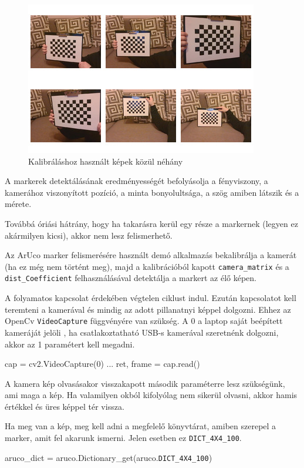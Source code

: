 \begin{figure}[htp]
    \centering
   	\includegraphics[width=7truecm, height=6truecm]{images/calibration.jpg}
	\caption{Kalibráláshoz használt képek közül néhány}
\end{figure}



A markerek detektálásának eredményességét befolyásolja a fényviszony, a kamerához viszonyított pozíció, a minta bonyolultsága, a szög amiben látszik és a mérete. 

Továbbá óriási hátrány, hogy ha takarásra kerül egy része a markernek (legyen ez akármilyen kicsi), akkor nem lesz felismerhető.

Az ArUco marker felismerésére használt demó alkalmazás bekalibrálja a kamerát (ha ez még nem történt meg), majd a kalibrációból kapott \texttt{camera\_matrix} és a \texttt{dist\_Coefficient} felhasználásával detektálja a markert az élő képen.

A folyamatos kapcsolat érdekében végtelen ciklust indul.
Ezután kapcsolatot kell teremteni a kamerával és mindig az adott pillanatnyi képpel dolgozni. 
Ehhez az OpenCv \texttt{VideoCapture} függvényére van szükség. A 0 a laptop saját beépített kameráját jelöli , ha csatlakoztatható USB-s kamerával szeretnénk dolgozni, akkor az 1 paramétert kell megadni.

\begin{python}
cap = cv2.VideoCapture(0)
...
ret, frame = cap.read()
\end{python}
A kamera kép olvasásakor visszakapott második paraméterre lesz szükségünk, ami maga a kép. Ha valamilyen okból kifolyólag nem sikerül olvasni, akkor hamis értékkel és üres képpel tér vissza.

Ha meg van a kép, meg kell adni a megfelelő könyvtárat, amiben szerepel a marker, amit fel akarunk ismerni. Jelen esetben ez  \texttt{DICT\_4X4\_100}.
\begin{python}
aruco_dict = aruco.Dictionary_get(aruco.\texttt{DICT\_4X4\_100})
\end{python}

